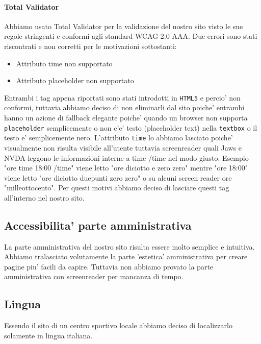 \paragraph{Total Validator}
Abbiamo usato Total Validator per la validazione del nostro sito visto le sue regole stringenti e conformi agli standard WCAG 2.0 AAA. Due errori sono stati riscontrati e non corretti per le motivazioni sottostanti:
\begin{itemize}
	\item Attributo time non supportato
	\item Attributo placeholder non supportato
\end{itemize}
Entrambi i tag appena riportati sono stati introdotti in \texttt{HTML5} e percio' non conformi, tuttavia abbiamo deciso di non eliminarli dal sito poiche' entrambi hanno un azione di fallback elegante poiche' quando un browser non supporta \texttt{placeholder} semplicemente o non c'e' testo (placeholder text) nella \texttt{textbox} o il testo e' semplicemente nero.
L'attributo \texttt{time} lo abbiamo lasciato poiche' visualmente non risulta visibile all'utente tuttavia screenreader quali Jaws e NVDA leggono le informazioni interne a time /time nel modo giusto. 
Esempio "ore time 18:00 /time" viene letto "ore diciotto e zero zero" mentre "ore 18:00" viene letto "ore diciotto duepunti zero zero" o su alcuni screen reader ore "milleottocento".
Per questi motivi abbiamo deciso di lasciare questi tag all'interno nel nostro sito.

\subsection{Accessibilita' parte amministrativa}
La parte amministrativa del nostro sito risulta essere molto semplice e intuitiva.
Abbiamo tralasciato volutamente la parte 'estetica' amministrativa per creare pagine piu' facili da capire.\newline
Tuttavia non abbiamo provato la parte amministrativa con screenreader per mancanza di tempo.
\subsection{Lingua}
Essendo il sito di un centro sportivo locale abbiamo deciso di localizzarlo solamente in lingua italiana.

